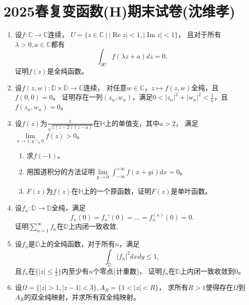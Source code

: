 \section{2025春复变函数(H)期末试卷(沈维孝)}
\begin{enumerate}
\item 设$f:\mathbb{C}\rightarrow\mathbb{C}$连续，
$U=\{z\in\mathbb{C}\ \big|\ |\operatorname{Re}z|<1,|\operatorname{Im}z|<1\}$，
且对于所有$\lambda>0,a\in\mathbb{C}$都有
$$\int_{\partial U}f(\lambda z+a)dz=0.$$
证明$f(z)$是全纯函数。
\item 设$f(z,w):\mathbb{D}\times\mathbb{D}\rightarrow\mathbb{C}$连续，
对任意$w\in\mathbb{C}$，$z \mapsto f(z,w)$全纯，且$f(0,0)=0$。
证明存在一列$(z_n,w_n)$，满足$0<|z_n|^2+|w_n|^2<\frac{1}{n}$，且$f(z_n,w_n)=0$。
\item 设$f(z)$为$\frac{1}{\sqrt{z(z-2)(z-a)}}$在$\mathbb{H}$上的单值支，其中$a>2$，
满足$\lim\limits_{x\rightarrow1,y\searrow0}f(z)>0$。
\begin{enumerate}[label=(\roman*)]
\item 求$f(-1)$。
\item 用围道积分的方法证明$\lim\limits_{y\rightarrow0}\int_{-\infty}^{+\infty}f(x+yi)dx=0$。
\item $F(z)$为$f(z)$在$\mathbb{H}$上的一个原函数，证明$F(z)$是单叶函数。
\end{enumerate}
\item 设$f_n:\mathbb{D}\rightarrow\mathbb{D}$全纯，满足
$$f_n(0)=f_n'(0)=\dots=f_n^{(n)}(0)=0.$$
证明$\sum_{n=1}^{\infty}f_n$在$\mathbb{D}$上内闭一致收敛.
\item 设${f_n}$是$\mathbb{D}$上的全纯函数，对于所有$n$，满足
$$\int_{\mathbb{D}}|f_n|^2dxdy\leqslant 1,$$
且$f_n$在$\big\{|z|\leqslant\frac{1}{2}\big\}$内至少有$n$个零点(计重数)，
证明${f_n}$在$\mathbb{D}$上内闭一致收敛到$0$。
\item 设$\Omega=\{|z|>1,|z-1|<3\},A_R=\{1<|z|<R\}$，
求所有$R>1$使得存在$\Omega$到$A_R$的双全纯映射，并求所有双全纯映射。
\end{enumerate}

